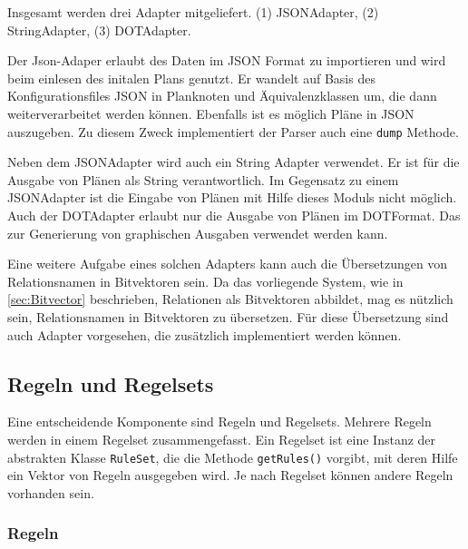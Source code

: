 Insgesamt werden drei Adapter mitgeliefert. (1) JSON\-Adapter, (2) String\-Adapter, (3) DOT\-Adapter.

Der Json-Adaper erlaubt des Daten im JSON Format zu importieren und wird beim einlesen des initalen Plans genutzt. Er wandelt auf Basis des Konfigurationsfiles JSON in Planknoten und Äquivalenzklassen um, die dann weiterverarbeitet werden können. Ebenfalls ist es möglich Pläne in JSON auszugeben. Zu diesem Zweck implementiert der Parser auch eine \texttt{dump} Methode.

Neben dem JSON\-Adapter wird auch ein String Adapter verwendet. Er ist für die Ausgabe von Plänen als String verantwortlich. Im Gegensatz zu einem JSON\-Adapter ist die Eingabe von Plänen mit Hilfe dieses Moduls nicht möglich. Auch der DOT\-Adapter erlaubt nur die Ausgabe von Plänen im DOT\-Format. Das zur Generierung von graphischen Ausgaben verwendet werden kann.

Eine weitere Aufgabe eines solchen Adapters kann auch die Übersetzungen von Relationsnamen in Bitvektoren sein. Da das vorliegende System, wie in \ref{sec:Bitvector} beschrieben, Relationen als Bitvektoren abbildet, mag es nützlich sein, Relationsnamen in Bitvektoren zu übersetzen. Für diese Übersetzung sind auch Adapter vorgesehen, die zusätzlich implementiert werden können.




\subsection{Regeln und Regelsets}

Eine entscheidende Komponente sind Regeln und Regelsets. Mehrere Regeln werden in einem Regelset zusammengefasst. Ein Regelset ist eine Instanz der abstrakten Klasse \texttt{RuleSet}, die die Methode \texttt{getRules()} vorgibt, mit deren Hilfe ein Vektor von Regeln ausgegeben wird. Je nach Regelset können andere Regeln vorhanden sein.


\subsubsection{Regeln}

